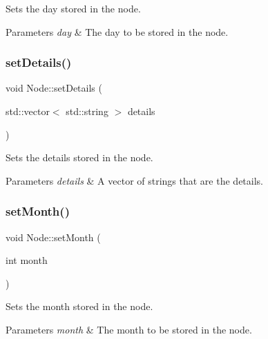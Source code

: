 Sets the day stored in the node. 


\begin{DoxyParams}{Parameters}
{\em day} & The day to be stored in the node. \\
\hline
\end{DoxyParams}
\hypertarget{class_node_a9541a5a3f82ea381417dcfe36c3844a6}{}\label{class_node_a9541a5a3f82ea381417dcfe36c3844a6} 
\subsubsection{\texorpdfstring{set\+Details()}{setDetails()}}
{\footnotesize\ttfamily void Node\+::set\+Details (\begin{DoxyParamCaption}\item[{std\+::vector$<$ std\+::string $>$}]{details }\end{DoxyParamCaption})}



Sets the details stored in the node. 


\begin{DoxyParams}{Parameters}
{\em details} & A vector of strings that are the details. \\
\hline
\end{DoxyParams}
\hypertarget{class_node_ad8e3dddfff350a83c7f1026ffe346e62}{}\label{class_node_ad8e3dddfff350a83c7f1026ffe346e62} 
\subsubsection{\texorpdfstring{set\+Month()}{setMonth()}}
{\footnotesize\ttfamily void Node\+::set\+Month (\begin{DoxyParamCaption}\item[{int}]{month }\end{DoxyParamCaption})}



Sets the month stored in the node. 


\begin{DoxyParams}{Parameters}
{\em month} & The month to be stored in the node. \\
\hline
\end{DoxyParams}
\hypertarget{class_node_ae0062432733265c491000494625c3a04}{}\label{class_node_ae0062432733265c491000494625c3a04} 
